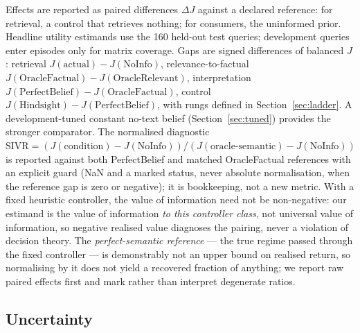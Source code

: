 \documentclass[runningheads]{llncs}
\begin{document}
Effects are reported as paired differences $\Delta J$ against a declared
reference: for retrieval, a control that retrieves nothing; for consumers,
the uninformed prior. Headline utility estimands use the 160 held-out test
queries; development queries enter episodes only for matrix coverage. Gaps
are signed differences of balanced $J$: retrieval $J(\text{actual}) -
J(\text{NoInfo})$, relevance-to-factual $J(\text{OracleFactual}) -
J(\text{OracleRelevant})$, interpretation $J(\text{PerfectBelief}) -
J(\text{OracleFactual})$, control $J(\text{Hindsight}) -
J(\text{PerfectBelief})$, with rungs defined in
Section~\ref{sec:ladder}. A development-tuned constant no-text belief
(Section~\ref{sec:tuned}) provides the stronger comparator. The normalised
diagnostic $\mathrm{SIVR} = (J(\text{condition}) - J(\text{NoInfo})) /
(J(\text{oracle-semantic}) - J(\text{NoInfo}))$ is reported against both
PerfectBelief and matched OracleFactual references with an explicit guard
(NaN and a marked status, never absolute normalisation, when the reference
gap is zero or negative); it is bookkeeping, not a new metric. With a fixed
heuristic controller, the value of information need not be non-negative: our
estimand is the value of information \emph{to this controller class}, not
universal value of information, so negative realised value diagnoses the
pairing, never a violation of decision theory. The \emph{perfect-semantic
reference} --- the true regime passed through the fixed controller --- is
demonstrably not an upper bound on realised return, so normalising by it
does not yield a recovered fraction of anything; we report raw paired
effects first and mark rather than interpret degenerate ratios.

\subsection{Uncertainty}
\label{sec:uncertainty}
\end{document}
